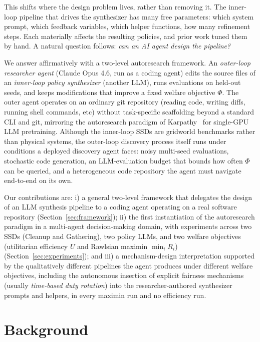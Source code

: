 \documentclass{article}
\begin{document}
This shifts where the design problem lives, rather than removing it. The inner-loop pipeline that drives the synthesizer has many free parameters: which system prompt, which feedback variables, which helper functions, how many refinement steps. Each materially affects the resulting policies, and prior work tuned them by hand. A natural question follows: \emph{can an AI agent design the pipeline?}

We answer affirmatively with a two-level autoresearch framework. An \emph{outer-loop researcher agent} (Claude Opus 4.6, run as a coding agent) edits the source files of an \emph{inner-loop policy synthesizer} (another LLM), runs evaluations on held-out seeds, and keeps modifications that improve a fixed welfare objective $\Phi$. The outer agent operates on an ordinary git repository (reading code, writing diffs, running shell commands, etc) without task-specific scaffolding beyond a standard CLI and git, mirroring the autoresearch paradigm of Karpathy~\cite{karpathy2026} for single-GPU LLM pretraining. Although the inner-loop SSDs are gridworld benchmarks rather than physical systems, the outer-loop discovery process itself runs under conditions a deployed discovery agent faces: noisy multi-seed evaluations, stochastic code generation, an LLM-evaluation budget that bounds how often $\Phi$ can be queried, and a heterogeneous code repository the agent must navigate end-to-end on its own.

Our contributions are: i) a general two-level framework that delegates the design of an LLM synthesis pipeline to a coding agent operating on a real software repository (Section~\ref{sec:framework}); ii) the first instantiation of the autoresearch paradigm in a multi-agent decision-making domain, with experiments across two SSDs (Cleanup and Gathering), two policy LLMs, and two welfare objectives (utilitarian efficiency $U$ and Rawlsian maximin $\min_i R_i$) (Section~\ref{sec:experiments}); and iii) a mechanism-design interpretation supported by the qualitatively different pipelines the agent produces under different welfare objectives, including the autonomous insertion of explicit fairness mechanisms (usually \emph{time-based duty rotation}) into the researcher-authored synthesizer prompts and helpers, in every maximin run and no efficiency run.

\section{Background}
\end{document}
